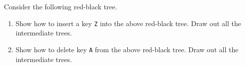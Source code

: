 Consider the following red-black tree.


\begin{figure}[h]
\centerline{}\end{figure}


\begin{enumerate}

\item  Show how to insert a key {\tt Z} into the above red-black tree.
Draw out all the intermediate trees.

\item  Show how to delete key {\tt A} from the above red-black tree.
Draw out all the intermediate trees.

\end{enumerate}
